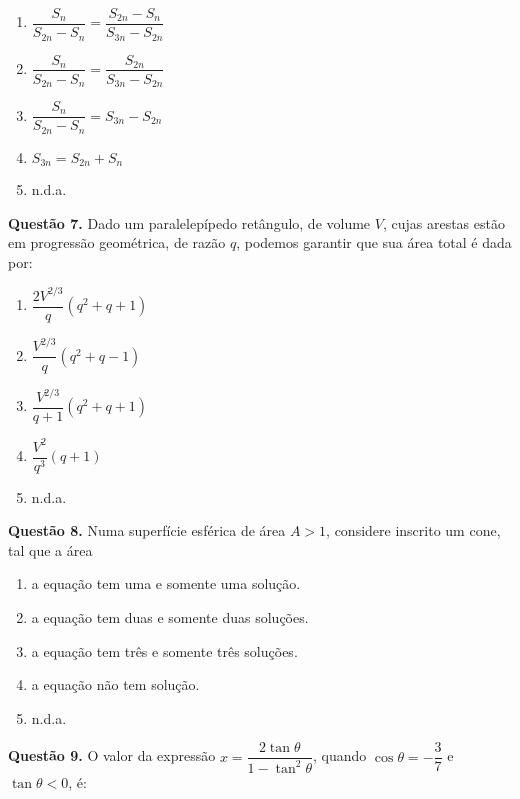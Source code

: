 \documentclass[11pt]{article}
\begin{document}
\begin{multicols}{3}
    \begin{enumerate}[\bf A (\quad)]
        \item $\dfrac{S_n}{S_{2n} - S_n} = \dfrac{S_{2n} - S_n}{S_{3n} - S_{2n}}$
        \item $\dfrac{S_n}{S_{2n} - S_n} = \dfrac{S_{2n}}{S_{3n} - S_{2n}}$
        \item $\dfrac{S_n}{S_{2n} - S_n} = S_{3n} - S_{2n}$
        \item $S_{3n} = S_{2n} + S_{n}$
        \item n.d.a.
    \end{enumerate}
\end{multicols}

\textbf{Questão 7.} Dado um paralelepípedo retângulo, de volume $V$, cujas arestas estão em progressão geométrica, de razão $q$, podemos garantir que sua área total é dada por:

\begin{multicols}{3}
\begin{enumerate}[\bf A (\quad)]
    \item $\dfrac{2V^{2/3}}{q}(q^2 + q + 1)$
    \item $\dfrac{V^{2/3}}{q}(q^2 + q - 1)$
    \item $\dfrac{V^{2/3}}{q+1}(q^2 + q + 1)$
    \item $\dfrac{V^2}{q^3}(q + 1)$
    \item n.d.a.
\end{enumerate}
\end{multicols}

\textbf{Questão 8.} Numa superfície esférica de área $A > 1$, considere inscrito um cone, tal que a área 	

\begin{enumerate}[\bf A (\quad)]
    \item a equação tem uma e somente uma solução. 
    \item a equação tem duas e somente duas soluções. 
    \item a equação tem três e somente três soluções.
    \item a equação não tem solução.
    \item n.d.a.
\end{enumerate}

\textbf{Questão 9.} O    valor    da    expressão   $x = \dfrac{2 \tan \theta}{1 - \tan^2 \theta}$,    quando    $\cos \theta = -\dfrac{3}{7}$ e $\tan \theta < 0$, é:  
\end{document}
